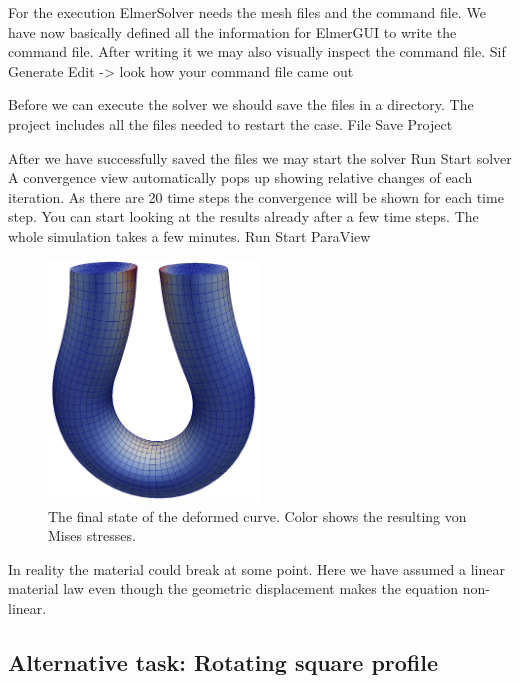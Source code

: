 For the execution 
ElmerSolver needs the mesh files and the command file. We have now basically defined
all the information for ElmerGUI to write the command file. After writing it we may also visually 
inspect the command file.
\ttbegin
Sif 
  Generate
  Edit -> look how your command file came out  
\ttend

Before we can execute the solver we should save the files in a directory. The project includes
all the files needed to restart the case.
\ttbegin
File 
  Save Project
\ttend

After we have successfully saved the files we may start the solver
\ttbegin
Run
  Start solver
\ttend
A convergence view automatically pops up showing relative changes of each iteration.
As there are 20 time steps the convergence will be shown for each time step.
You can start looking at the results already after a few time steps. The whole simulation
takes a few minutes. 
\ttbegin
Run
  Start ParaView
\ttend


\begin{figure}[h!]
\begin{center}
  \includegraphics[width=0.5\textwidth]{UturnVonMisesStressMesh}
  \caption{The final state of the deformed curve. Color shows the resulting von Mises stresses.}
  \label{fig:UturnVonMisesStress}
\end{center}
\end{figure}

In reality the material could break at some point. Here we have assumed a linear material law
even though the geometric displacement makes the equation non-linear. 


\subsection*{Alternative task: Rotating square profile}

